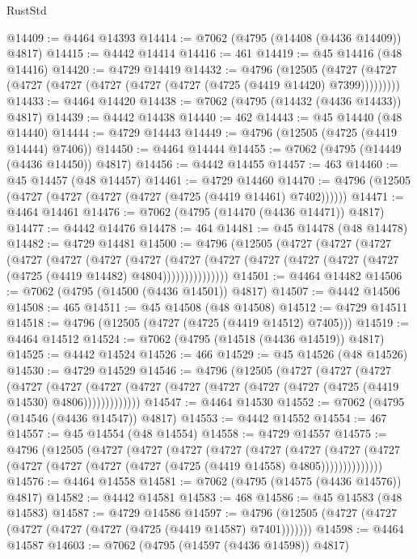 \begin{lexlean}{RustStd}
\begin{coremodule}
@14409 := @4464 @14393
@14414 := @7062 (@4795 (@14408 (@4436 @14409)) @4817)
@14415 := @4442 @14414
@14416 := 461
@14419 := @45 @14416 (@48 @14416)
@14420 := @4729 @14419
@14432 := @4796
    (@12505 (@4727 (@4727 (@4727 (@4727 (@4727 (@4727 (@4727 (@4725 (@4419 @14420) @7399)))))))))
@14433 := @4464 @14420
@14438 := @7062 (@4795 (@14432 (@4436 @14433)) @4817)
@14439 := @4442 @14438
@14440 := 462
@14443 := @45 @14440 (@48 @14440)
@14444 := @4729 @14443
@14449 := @4796 (@12505 (@4725 (@4419 @14444) @7406))
@14450 := @4464 @14444
@14455 := @7062 (@4795 (@14449 (@4436 @14450)) @4817)
@14456 := @4442 @14455
@14457 := 463
@14460 := @45 @14457 (@48 @14457)
@14461 := @4729 @14460
@14470 := @4796 (@12505 (@4727 (@4727 (@4727 (@4727 (@4725 (@4419 @14461) @7402))))))
@14471 := @4464 @14461
@14476 := @7062 (@4795 (@14470 (@4436 @14471)) @4817)
@14477 := @4442 @14476
@14478 := 464
@14481 := @45 @14478 (@48 @14478)
@14482 := @4729 @14481
@14500 := @4796
    (@12505
      (@4727
        (@4727
          (@4727
            (@4727
              (@4727
                (@4727
                  (@4727
                    (@4727
                      (@4727 (@4727 (@4727 (@4727 (@4727 (@4725 (@4419 @14482) @4804)))))))))))))))
@14501 := @4464 @14482
@14506 := @7062 (@4795 (@14500 (@4436 @14501)) @4817)
@14507 := @4442 @14506
@14508 := 465
@14511 := @45 @14508 (@48 @14508)
@14512 := @4729 @14511
@14518 := @4796 (@12505 (@4727 (@4725 (@4419 @14512) @7405)))
@14519 := @4464 @14512
@14524 := @7062 (@4795 (@14518 (@4436 @14519)) @4817)
@14525 := @4442 @14524
@14526 := 466
@14529 := @45 @14526 (@48 @14526)
@14530 := @4729 @14529
@14546 := @4796
    (@12505
      (@4727
        (@4727
          (@4727
            (@4727
              (@4727
                (@4727 (@4727 (@4727 (@4727 (@4727 (@4727 (@4725 (@4419 @14530) @4806)))))))))))))
@14547 := @4464 @14530
@14552 := @7062 (@4795 (@14546 (@4436 @14547)) @4817)
@14553 := @4442 @14552
@14554 := 467
@14557 := @45 @14554 (@48 @14554)
@14558 := @4729 @14557
@14575 := @4796
    (@12505
      (@4727
        (@4727
          (@4727
            (@4727
              (@4727
                (@4727
                  (@4727
                    (@4727 (@4727 (@4727 (@4727 (@4727 (@4725 (@4419 @14558) @4805))))))))))))))
@14576 := @4464 @14558
@14581 := @7062 (@4795 (@14575 (@4436 @14576)) @4817)
@14582 := @4442 @14581
@14583 := 468
@14586 := @45 @14583 (@48 @14583)
@14587 := @4729 @14586
@14597 := @4796 (@12505 (@4727 (@4727 (@4727 (@4727 (@4727 (@4725 (@4419 @14587) @7401)))))))
@14598 := @4464 @14587
@14603 := @7062 (@4795 (@14597 (@4436 @14598)) @4817)

\end{coremodule}
\end{lexlean}
